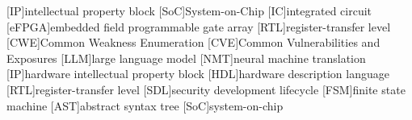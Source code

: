 [IP]{intellectual property block}
[SoC]{System-on-Chip}
[IC]{integrated circuit}
[eFPGA]{embedded field programmable gate array}
[RTL]{register-transfer level}
[CWE]{Common Weakness Enumeration}
[CVE]{Common Vulnerabilities and Exposures}
[LLM]{large language model}
[NMT]{neural machine translation}
[IP]{hardware intellectual property block}
[HDL]{hardware description language}
[RTL]{register-transfer level}
[SDL]{security development lifecycle}
[FSM]{finite state machine}
[AST]{abstract syntax tree}
[SoC]{system-on-chip}
